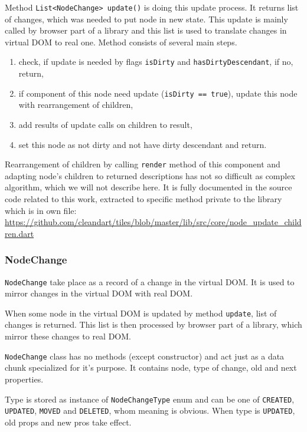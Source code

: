       Method \texttt{List<NodeChange> update()} is doing this update process. 
      It returns list of changes, which was needed to put node in new state.
      This update is mainly called by browser part of a library and this list is used to translate changes in virtual DOM to real one. 
      Method consists of several main steps.
      \begin{enumerate}
        \item check, if update is needed by flags \texttt{isDirty} and \texttt{hasDirtyDescendant}, if no, return,
        \item if component of this node need update (\texttt{isDirty == true}), update this node with rearrangement of children,
        \item add results of update calls on children to result,
        \item set this node as not dirty and not have dirty descendant and return.
      \end{enumerate}

      Rearrangement of children by calling \texttt{render} method of this component 
      and adapting node's children to returned descriptions 
      has not so difficult as complex algorithm, which we will not describe here. 
      It is fully documented in the source code related to this work, 
      extracted to specific method private to the library which is in own file:
      \url{https://github.com/cleandart/tiles/blob/master/lib/src/core/node_update_children.dart}

    \subsubsection{NodeChange}\label{subsubsec:our-architecture-core-node-change}
      \texttt{NodeChange} take place as a record of a change in the virtual DOM. 
      It is used to mirror changes in the virtual DOM with real DOM. 

      When some node in the virtual DOM is updated by method \texttt{update}, list of changes is returned. 
      This list is then processed by browser part of a library, which mirror these changes to real DOM.

      \texttt{NodeChange} class has no methods (except constructor) and act just as a data chunk specialized for it's purpose. 
      It contains node, type of change, old and next properties. 

      Type is stored as instance of \texttt{NodeChangeType} enum and can be one of \texttt{CREATED}, \texttt{UPDATED}, 
      \texttt{MOVED} and \texttt{DELETED}, whom meaning is obvious. 
      When type is \texttt{UPDATED}, old props and new pros take effect. 

